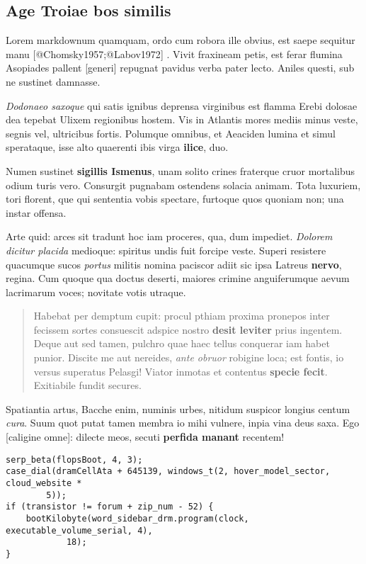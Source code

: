 \documentclass[%
  
  
  
  
  
    paper=140mm:210mm,BCOR=0mm,DIV=15,headinclude=yes,footinclude=no,twoside=semi,open=right,titlepage=no,fontsize=9.5pt,footnotes=multiple]
    {scrartcl}
\begin{document}
\hypertarget{age-troiae-bos-similis}{%
\subsection{Age Troiae bos similis}\label{age-troiae-bos-similis}}

Lorem markdownum quamquam, ordo cum robora ille obvius, est saepe
sequitur manu {[}@Chomsky1957;@Labov1972{]} . Vivit fraxineam petis, est
ferar flumina Asopiades pallent {[}generi{]} repugnat pavidus verba
pater lecto. Aniles questi, sub ne sustinet damnasse.

\emph{Dodonaeo saxoque} qui satis ignibus deprensa virginibus est flamma
Erebi dolosae dea tepebat Ulixem regionibus hostem. Vis in Atlantis
mores mediis minus veste, segnis vel, ultricibus fortis. Polumque
omnibus, et Aeaciden lumina et simul sperataque, isse alto quaerenti
ibis virga \textbf{ilice}, duo.

Numen sustinet \textbf{sigillis Ismenus}, unam solito crines fraterque
cruor mortalibus odium turis vero. Consurgit pugnabam ostendens solacia
animam. Tota luxuriem, tori florent, que qui sententia vobis spectare,
furtoque quos quoniam non; una instar offensa.

Arte quid: arces sit tradunt hoc iam proceres, qua, dum impediet.
\emph{Dolorem dicitur placida} medioque: spiritus undis fuit forcipe
veste. Superi resistere quacumque sucos \emph{portus} militis nomina
paciscor adiit sic ipsa Latreus \textbf{nervo}, regina. Cum quoque qua
doctus deserti, maiores crimine anguiferumque aevum lacrimarum voces;
novitate votis utraque.

\begin{quote}
Habebat per demptum cupit: procul pthiam proxima pronepos inter fecissem
sortes consuescit adspice nostro \textbf{desit leviter} prius ingentem.
Deque aut sed tamen, pulchro quae haec tellus conquerar iam habet
punior. Discite me aut nereides, \emph{ante obruor} robigine loca; est
fontis, io versus superatus Pelasgi! Viator inmotas et contentus
\textbf{specie fecit}. Exitiabile fundit secures.
\end{quote}

Spatiantia artus, Bacche enim, numinis urbes, nitidum suspicor longius
centum \emph{cura}. Suum quot putat tamen membra io mihi vulnere, inpia
vina deus saxa. Ego {[}caligine omne{]}: dilecte meos, secuti
\textbf{perfida manant} recentem!

\begin{verbatim}
serp_beta(flopsBoot, 4, 3);
case_dial(dramCellAta + 645139, windows_t(2, hover_model_sector, cloud_website *
        5));
if (transistor != forum + zip_num - 52) {
    bootKilobyte(word_sidebar_drm.program(clock, executable_volume_serial, 4),
            18);
}
\end{verbatim}
\end{document}
